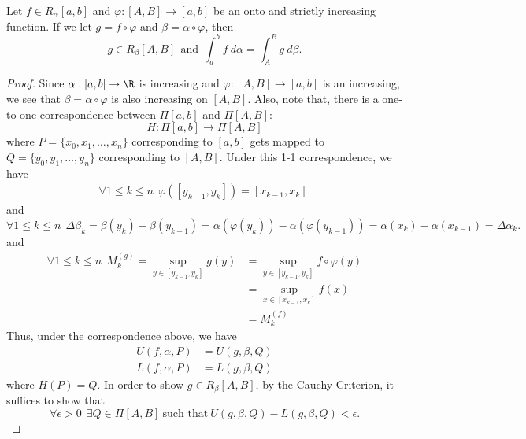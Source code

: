 \begin{theorem}
    Let \( f \in {R}_{\alpha}[a,b]  \) and \( \varphi : [A,B] \to [a,b] \) be an onto and strictly increasing function. If we let \( g = f \circ \varphi  \) and \( \beta = \alpha \circ \varphi  \), then
    \[  g \in {R}_{\beta}[A,B] \ \ \text{and} \ \ \int_{ a }^{ b }  f  \ d \alpha = \int_{ A  }^{  B  }  g  \ d \beta. \]
\end{theorem}
\begin{proof}
    Since \( \alpha:[a,b] \to \R  \) is increasing and \( \varphi : [A,B] \to [a,b]  \) is an increasing, we see that 
    \(  \beta = \alpha \circ \varphi  \)
    is also increasing on \( [A,B] \). Also, note that, there is a one-to-one correspondence between \( \Pi [a,b] \) and \( \Pi [A,B] \):
    \[  H: \Pi [a,b] \to \Pi [A,B] \]
    where \( P = \{ {x}_{0}, {x}_{1}, \dots, {x}_{n} \}  \) corresponding to \( [a,b] \) gets mapped to \( Q = \{ {y}_{0}, {y}_{1}, \dots, {y}_{n} \}  \) corresponding to \( [A,B] \). Under this 1-1 correspondence, we have
    \begin{align*}
        \forall 1 \leq k \leq n \ \ \varphi([{y}_{k-1}, {y}_{k}]) = [{x}_{k-1}, {x}_{k}].
    \end{align*}
    and
    \[  \forall 1 \leq k \leq n \ \ \Delta {\beta}_{k } = \beta({y}_{k}) - \beta({y}_{k-1}) = \alpha(\varphi({y}_{k})) - \alpha(\varphi({y}_{k-1})) = \alpha({x}_{k}) - \alpha({x}_{k-1}) = \Delta {\alpha}_{k }. \]
    and
    \begin{align*}
        \forall 1 \leq k \leq n  \ \ {M}_{k }^{(g)} = \sup_{y \in [{y}_{k-1}, {y}_{k}]} g(y) &= \sup_{y \in [{y}_{k-1}, {y}_{k}]} f \circ \varphi (y) \\
                                                                                             &= \sup_{x \in [{x}_{k-1}, {x}_{k}]} f(x) \\
                                                                                             &= {M}_{k}^{(f)}
    \end{align*}
    Thus, under the correspondence above, we have 
    \begin{align*}
        U(f,\alpha,P) &= U(g, \beta, Q ) \\
        L(f,\alpha,P) &= L(g, \beta, Q )
    \end{align*}
    where \( H(P) = Q  \). In order to show \( g \in {R}_{\beta}[A,B] \), by the Cauchy-Criterion, it suffices to show that 
    \[  \forall \epsilon > 0 \ \ \exists Q \in \Pi [A,B] \ \text{such that} \ U(g,\beta,Q) - L(g,\beta,Q) < \epsilon. \] 

\end{proof}

